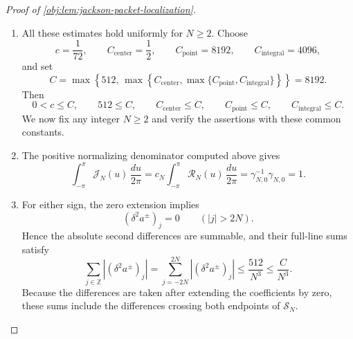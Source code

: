 \documentclass[11pt]{article}
\begin{document}
\begin{proof}[Proof of \cref{obj:lem:jackson-packet-localization}]
\begin{enumerate}
\item All these estimates hold uniformly for \(N\geq2\). Choose
\[
c=\frac1{72},\qquad
C_{\mathrm{center}}=\frac12,\qquad
C_{\mathrm{point}}=8192,\qquad
C_{\mathrm{integral}}=4096,
\]
and set
\[
C=\max\left\{
512,\,
\max\left\{
C_{\mathrm{center}},
\max\{C_{\mathrm{point}},C_{\mathrm{integral}}\}
\right\}
\right\}
=8192.
\]
Then
\[
0<c\leq C,\qquad
512\leq C,\qquad
C_{\mathrm{center}}\leq C,\qquad
C_{\mathrm{point}}\leq C,\qquad
C_{\mathrm{integral}}\leq C.
\]
We now fix any integer \(N\geq2\) and verify the assertions with these common constants.

\item The positive normalizing denominator computed above gives
\[
\int_{-\pi}^{\pi}\mathcal J_N(u)\,\frac{du}{2\pi}
=c_N\int_{-\pi}^{\pi}\mathcal R_N(u)\,\frac{du}{2\pi}
=\gamma_{N,0}^{-1}\gamma_{N,0}
=1.
\]

\item For either sign, the zero extension implies
\[
(\delta^2a^\pm)_j=0\qquad(|j|>2N).
\]
Hence the absolute second differences are summable, and their full-line sums satisfy
\[
\sum_{j\in\mathbb Z}|(\delta^2a^\pm)_j|
=
\sum_{j=-2N}^{2N}|(\delta^2a^\pm)_j|
\leq\frac{512}{N^3}
\leq\frac C{N^3}.
\]
Because the differences are taken after extending the coefficients by zero, these sums include the differences crossing both endpoints of \(\mathcal S_N\).


\end{enumerate}
\end{proof}
\end{document}
